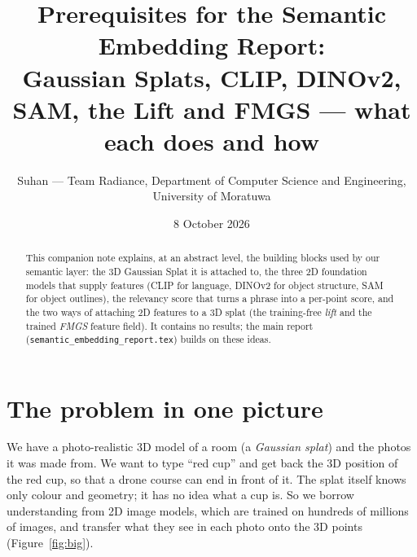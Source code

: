\documentclass[11pt,a4paper]{article}
\title{Prerequisites for the Semantic Embedding Report:\\[2pt]
\large Gaussian Splats, CLIP, DINOv2, SAM, the Lift and FMGS --- what each does and how}
\author{Suhan --- Team Radiance, Department of Computer Science and Engineering,\\University of Moratuwa}
\date{8 October 2026}
\newcommand{\code}[1]{\texttt{#1}}
\begin{document}
\maketitle

\begin{abstract}
This companion note explains, at an abstract level, the building blocks used by our semantic layer: the 3D
Gaussian Splat it is attached to, the three 2D foundation models that supply features (CLIP for language, DINOv2
for object structure, SAM for object outlines), the relevancy score that turns a phrase into a per-point score,
and the two ways of attaching 2D features to a 3D splat (the training-free \emph{lift} and the trained
\emph{FMGS} feature field). It contains no results; the main report (\code{semantic\_embedding\_report.tex}) builds
on these ideas.
\end{abstract}

\tableofcontents

\section{The problem in one picture}

We have a photo-realistic 3D model of a room (a \emph{Gaussian splat}) and the photos it was made from. We want to
type ``red cup'' and get back the 3D position of the red cup, so that a drone course can end in front of it. The
splat itself knows only colour and geometry; it has no idea what a cup is. So we borrow understanding from 2D image
models, which are trained on hundreds of millions of images, and transfer what they see in each photo onto the 3D
points (Figure~\ref{fig:big}).
\end{document}
